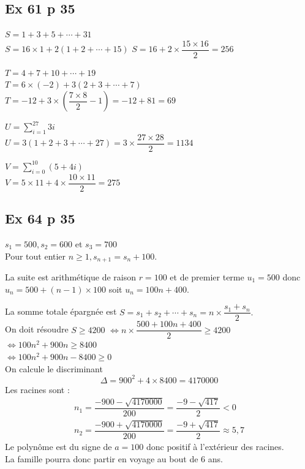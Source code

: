 \documentclass[a4paper,french]{book}
\begin{document}
\subsection*{Ex 61 p 35}
\begin{enumMet}
    \item 
    \begin{enumMet}
    \item $S=1+3+5+\cdots+31$\\
    $S=16 \times 1+2(1+2+\cdots+15)$
    $S=16+2 \times \dfrac{15 \times 16}{2}=256$
    \item $T=4+7+10+\cdots+19$\\
    $T=6 \times(-2)+3(2+3+\cdots+7)$\\
    $T=-12+3 \times\left(\dfrac{7 \times 8}{2}-1\right)=-12+81=69$
    \end{enumMet}
    \item 
    \begin{enumMet}
    \item $U=\sum \limits_{i=1}^{27} 3 i$\\
$U=3(1+2+3+\cdots+27)=3 \times \dfrac{27 \times 28}{2}=1134$
    \item $V=\sum \limits_{i=0}^{10}(5+4 i)$\\
$V=5 \times 11+4 \times \dfrac{10 \times 11}{2}=275$
    \end{enumMet}
\end{enumMet}

\subsection*{Ex 64 p 35}
\begin{enumMet}
    \item $s_{1}=500, s_{2}=600$ et $s_{3}=700$\\
    Pour tout entier $n \geqslant 1, s_{n+1}=s_{n}+100$.
    \item La suite est arithmétique de raison $r=100$ et de premier terme $u_{1}=500$ donc $u_{n}=500+(n-1) \times 100$ soit $u_{n}=100 n+400$.
    \item La somme totale épargnée est $S=s_{1}+s_{2}+\cdots+s_{n}=n \times \dfrac{s_{1}+s_{n}}{2} .$\\
    On doit résoudre $S \geq 4200$ $\Longleftrightarrow n \times \dfrac{500+100 n+400}{2} \geq 4200$\\
    $\Longleftrightarrow 100 n^{2}+900 n \geq 8400$\\
    $\Longleftrightarrow 100 n^{2}+900 n-8400 \geq 0$\\
    On calcule le discriminant
    $$
    \Delta=900^{2}+4 \times 8400=4170000
    $$
    Les racines sont :
    $$
    \begin{array}{l}
    n_{1}=\dfrac{-900-\sqrt{4170000}}{200}=\dfrac{-9-\sqrt{417}}{2}<0 \\
    n_{2}=\dfrac{-900+\sqrt{4170000}}{200}=\dfrac{-9+\sqrt{417}}{2} \approx 5,7
    \end{array}
    $$
    Le polynôme est du signe de $a=100$ donc positif à l'extérieur des racines.\\
    La famille pourra donc partir en voyage au bout de 6 ans.
\end{enumMet}
\end{document}
